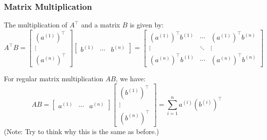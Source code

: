     \subsubsection{Matrix Multiplication}
    \begin{definition}
        The multiplication of \( A^\top \) and a matrix \( B \) is given by:
        \begin{equation}
            A^\top B = \begin{bmatrix}
                (a^{(1)})^\top \\
                \vdots \\
                (a^{(n)})^\top
                \end{bmatrix}
                \begin{bmatrix}
                b^{(1)} & \cdots & b^{(n)}
                \end{bmatrix}
                = \begin{bmatrix}
                (a^{(1)})^\top b^{(1)} & \cdots & (a^{(1)})^\top b^{(n)} \\
                \vdots & \ddots & \vdots \\
                (a^{(n)})^\top b^{(1)} & \cdots & (a^{(n)})^\top b^{(n)}
                \end{bmatrix}
        \end{equation}

        For regular matrix multiplication \( AB \), we have:
        \begin{equation}
            AB = \begin{bmatrix}
                a^{(1)} & \cdots & a^{(n)}
                \end{bmatrix}
                \begin{bmatrix}
                (b^{(1)})^\top \\
                \vdots \\
                (b^{(n)})^\top
                \end{bmatrix}
                = \sum_{i=1}^{n} a^{(i)} (b^{(i)})^\top
        \end{equation}
        (Note: Try to think why this is the same as before.)
    \end{definition}

